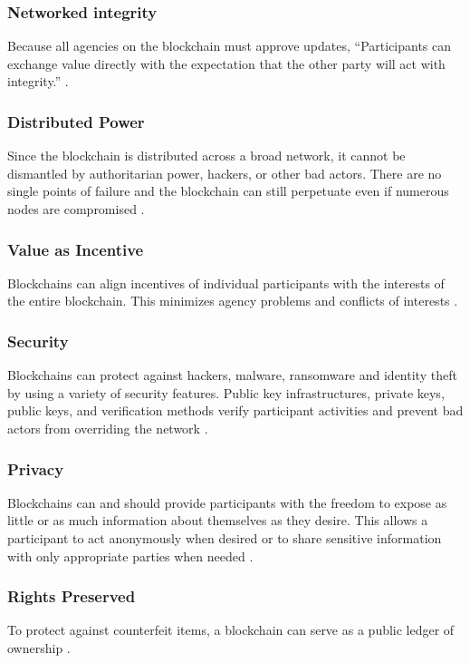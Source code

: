\documentclass[sigconf]{acmart}
\begin{document}
\subsubsection{Networked integrity} Because all agencies on the blockchain must approve updates, ``Participants can exchange value directly with the expectation that the other party will act with integrity.'' \cite{tapscott}. 

\subsubsection{Distributed Power} Since the blockchain is distributed across a broad network, it cannot be dismantled by authoritarian power, hackers, or other bad actors. There are no single points of failure and the blockchain can still perpetuate even if numerous nodes are compromised \cite{tapscott}.

\subsubsection{Value as Incentive} Blockchains can align incentives of individual participants with the interests of the entire blockchain. This minimizes agency problems and conflicts of interests \cite{tapscott}.

\subsubsection{Security} Blockchains can protect against hackers, malware, ransomware and identity theft by using a variety of security features. Public key infrastructures, private keys, public keys, and verification methods verify participant activities and prevent bad actors from overriding the network \cite{tapscott}. 

\subsubsection{Privacy} Blockchains can and should provide participants with the freedom to expose as little or as much information about themselves as they desire. This allows a participant to act anonymously when desired or to share sensitive information with only appropriate parties when needed \cite{tapscott}.

\subsubsection{Rights Preserved} To protect against counterfeit items, a blockchain can serve as a public ledger of ownership \cite{tapscott}.
\end{document}
